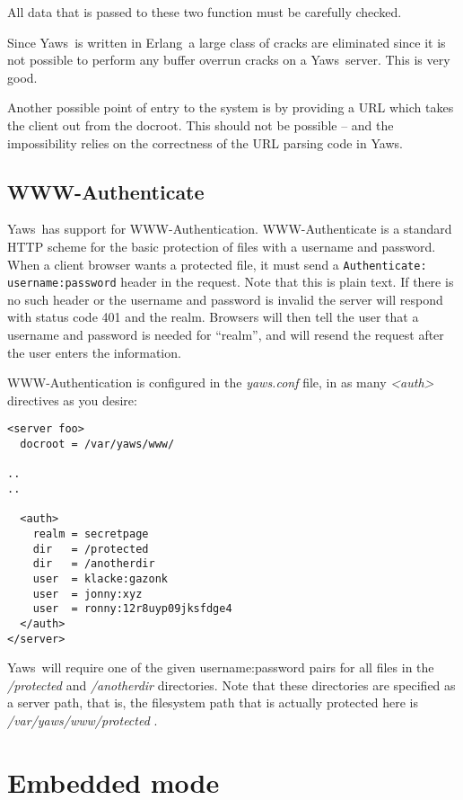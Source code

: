 \documentclass[11pt,oneside,english]{book}
\newcommand{\Erlang}            %
        {{\sc Erlang}}
\newcommand{\Yaws}            %
        {{\sc Yaws}}
\begin{document}
All data that is passed to these two function must be carefully
checked.

Since \Yaws\  is written in \Erlang\  a large class of cracks are
eliminated since it is not possible to perform any buffer overrun
cracks on a \Yaws\  server. This is very good.


Another possible point of entry to the system is by providing a URL
which takes the client out from the docroot. This should not be
possible -- and the impossibility relies on the correctness of the URL
parsing code in \Yaws{}.

\section{WWW-Authenticate}
\Yaws\  has support for WWW-Authentication.   WWW-Authenticate is a
standard HTTP scheme for the basic protection of files with a username
and password.  When a client browser wants a protected file, it must send a
\verb+Authenticate: username:password+ header in the request.  Note that
this is plain text.   If there is no such header or the username and
password is invalid the server will respond with status code 401 and
the realm.  Browsers will then tell the user that a username and
password is needed for ``realm'',  and will resend the request after
the user enters the information.

WWW-Authentication is configured in the \textit{yaws.conf} file, in as
many \textit{<auth>} directives as you desire:

\begin{verbatim}
<server foo>
  docroot = /var/yaws/www/

..
..

  <auth>
    realm = secretpage
    dir   = /protected
    dir   = /anotherdir
    user  = klacke:gazonk
    user  = jonny:xyz
    user  = ronny:12r8uyp09jksfdge4
  </auth>
</server>
\end{verbatim}


\Yaws\  will require one of the given username:password pairs for all
files in the \textit{/protected} and \textit{/anotherdir} directories.
Note that these directories are specified as a server path,  that is,
the filesystem path that is actually protected here is
\textit{/var/yaws/www/protected} .


\chapter {Embedded mode}
\label{embedded}
\end{document}
